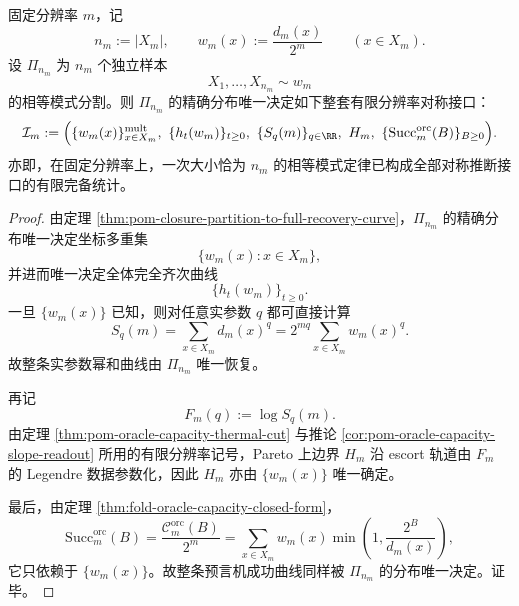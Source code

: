 \begin{theorem}[有限样本相等模式对有限分辨率对称接口的完备性]\label{thm:conclusion-sample-pattern-complete-symmetric-interface}
固定分辨率 \(m\)，记
\[
n_m:=|X_m|,
\qquad
w_m(x):=\frac{d_m(x)}{2^m}\qquad (x\in X_m).
\]
设 \(\Pi_{n_m}\) 为 \(n_m\) 个独立样本
\[
X_1,\dots,X_{n_m}\sim w_m
\]
的相等模式分割。则 \(\Pi_{n_m}\) 的精确分布唯一决定如下整套有限分辨率对称接口：
\[
\mathcal I_m:=
\Bigl(
\{w_m(x)\}_{x\in X_m}^{\mathrm{mult}},
\ \{h_t(w_m)\}_{t\ge 0},
\ \{S_q(m)\}_{q\in\RR},
\ H_m,
\ \{\mathrm{Succ}^{\mathrm{orc}}_m(B)\}_{B\ge 0}
\Bigr).
\]
亦即，在固定分辨率上，一次大小恰为 \(n_m\) 的相等模式定律已构成全部对称推断接口的有限完备统计。
\end{theorem}
\begin{proof}
由定理 \ref{thm:pom-closure-partition-to-full-recovery-curve}，\(\Pi_{n_m}\) 的精确分布唯一决定坐标多重集
\[
\{w_m(x):x\in X_m\},
\]
并进而唯一决定全体完全齐次曲线
\[
\{h_t(w_m)\}_{t\ge 0}.
\]
一旦 \(\{w_m(x)\}\) 已知，则对任意实参数 \(q\) 都可直接计算
\[
S_q(m)=\sum_{x\in X_m} d_m(x)^q
=2^{mq}\sum_{x\in X_m} w_m(x)^q.
\]
故整条实参数幂和曲线由 \(\Pi_{n_m}\) 唯一恢复。

再记
\[
F_m(q):=\log S_q(m).
\]
由定理 \ref{thm:pom-oracle-capacity-thermal-cut} 与推论 \ref{cor:pom-oracle-capacity-slope-readout} 所用的有限分辨率记号，Pareto 上边界 \(H_m\) 沿 escort 轨道由 \(F_m\) 的 Legendre 数据参数化，因此 \(H_m\) 亦由 \(\{w_m(x)\}\) 唯一确定。

最后，由定理 \ref{thm:fold-oracle-capacity-closed-form}，
\[
\mathrm{Succ}^{\mathrm{orc}}_m(B)
=\frac{\mathcal C_m^{\mathrm{orc}}(B)}{2^m}
=\sum_{x\in X_m} w_m(x)\min\!\left(1,\frac{2^B}{d_m(x)}\right),
\]
它只依赖于 \(\{w_m(x)\}\)。故整条预言机成功曲线同样被 \(\Pi_{n_m}\) 的分布唯一决定。证毕。
\end{proof}


